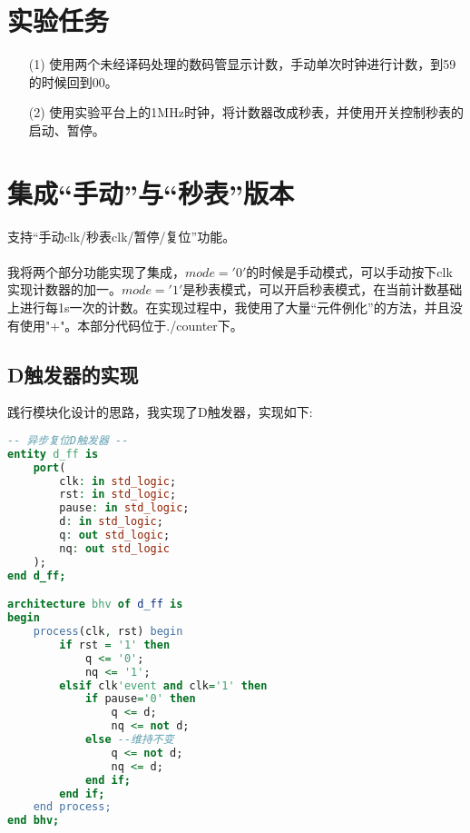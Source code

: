\documentclass[UTF8, onecolumn, a4paper]{article}
\begin{document}
\section{实验任务}
\begin{enumerate}
	\item[(1)] 使用两个未经译码处理的数码管显示计数，手动单次时钟进行计数，到59的时候回到00。
	\item[(2)] 使用实验平台上的1MHz时钟，将计数器改成秒表，并使用开关控制秒表的启动、暂停。
\end{enumerate}
	
\section{集成“手动”与“秒表”版本}
支持“手动clk/秒表clk/暂停/复位”功能。
\paragraph*{}
我将两个部分功能实现了集成，$mode = '0'$的时候是手动模式，可以手动按下clk实现计数器的加一。$mode='1'$是秒表模式，可以开启秒表模式，在当前计数基础上进行每1s一次的计数。在实现过程中，我使用了大量“元件例化”的方法，并且没有使用"+"。本部分代码位于./counter下。

\subsection{D触发器的实现}
践行模块化设计的思路，我实现了D触发器，实现如下:
\begin{lstlisting}[language={VHDL}, title={d\_ff.vhd}]
-- 异步复位D触发器 --
entity d_ff is
	port(
		clk: in std_logic;
		rst: in std_logic;
		pause: in std_logic;
		d: in std_logic;
		q: out std_logic;
		nq: out std_logic
	);
end d_ff;

architecture bhv of d_ff is
begin
	process(clk, rst) begin
		if rst = '1' then
			q <= '0';
			nq <= '1';
		elsif clk'event and clk='1' then
			if pause='0' then
				q <= d;
				nq <= not d;
			else --维持不变
				q <= not d;
				nq <= d;
			end if;
		end if;
	end process; 
end bhv;
\end{lstlisting}
\end{document}
